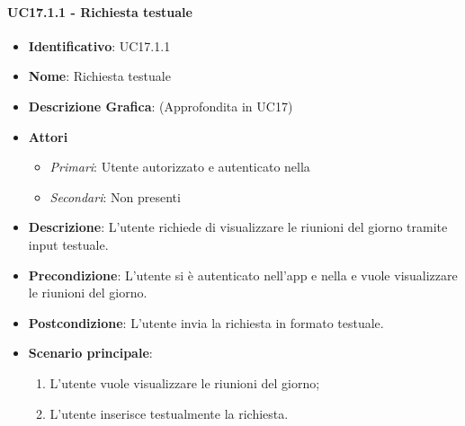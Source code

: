 \paragraph{UC17.1.1 - Richiesta testuale }
\begin{itemize}
	\item \textbf{Identificativo}: UC17.1.1
	\item \textbf{Nome}: Richiesta testuale
	\item\textbf{Descrizione Grafica}: (Approfondita in UC17)
	\item \textbf{Attori}
	\begin{itemize} 
		\item \textit{Primari}: Utente autorizzato e autenticato nella 
		\item \textit{Secondari}: Non presenti
	\end{itemize}
	\item \textbf{Descrizione}: L'utente richiede di visualizzare le riunioni del giorno tramite input testuale.
	\item \textbf{Precondizione}: L'utente si è autenticato nell'app e nella  e vuole visualizzare le riunioni del giorno.
	\item \textbf{Postcondizione}: L'utente invia la richiesta in formato testuale.
	\item \textbf{Scenario principale}:
	\begin{enumerate}
		\item L'utente vuole visualizzare le riunioni del giorno;
		\item L'utente inserisce testualmente la richiesta.
	\end{enumerate}
\end{itemize}

